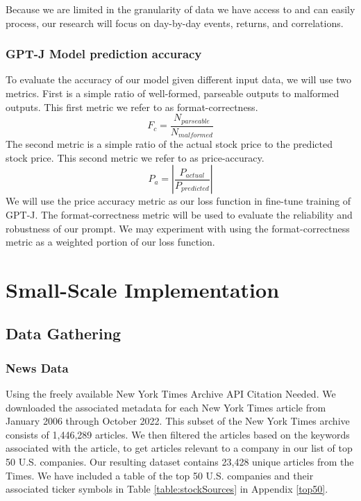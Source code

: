 \documentclass[conference]{IEEEtran}
\begin{document}
Because we are limited in the granularity of data we have access to and can easily process, our research will focus on day-by-day events, returns, and correlations.

\subsubsection{GPT-J Model prediction accuracy}
To evaluate the accuracy of our model given different input data, we will use two metrics. First is a simple ratio of well-formed, parseable outputs to malformed outputs. This first metric we refer to as format-correctness. 
\begin{equation}
    F_c=\frac{N_{parseable}}{N_{malformed}}
\end{equation}
The second metric is a simple ratio of the actual stock price to the predicted stock price. This second metric we refer to as price-accuracy.
\begin{equation}
    P_a=\left|\frac{P_{actual}}{P_{predicted}}\right|
\end{equation}
We will use the price accuracy metric as our loss function in fine-tune training of GPT-J. The format-correctness metric will be used to evaluate the reliability and robustness of our prompt. We may experiment with using the format-correctness metric as a weighted portion of our loss function.
\section{Small-Scale Implementation}
\subsection{Data Gathering} 
\subsubsection{News Data}
Using the freely available New York Times Archive API {Citation Needed}. We downloaded the associated metadata for each New York Times article from January 2006 through October 2022. This subset of the New York Times archive consists of 1,446,289 articles. We then filtered the articles based on the keywords associated with the article, to get articles relevant to a company in our list of top 50 U.S. companies. Our resulting dataset contains 23,428 unique articles from the Times. We have included a table of the top 50 U.S. companies and their associated ticker symbols in Table \ref{table:stockSources} in Appendix \ref{top50}.
\end{document}
